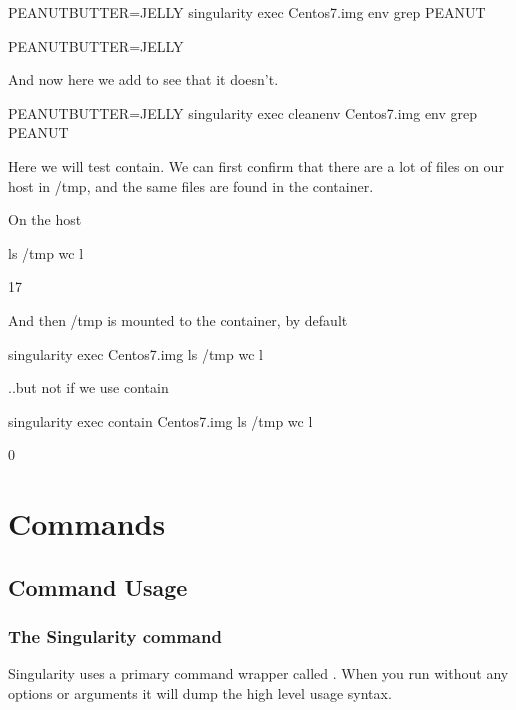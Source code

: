 \documentclass[letterpaper,10pt,english]{sphinxmanual}
\begin{document}
%
\begin{sphinxVerbatim}[commandchars=\\\{\}]
PEANUTBUTTER=JELLY singularity exec Centos7.img env \textbar{} grep PEANUT

PEANUTBUTTER=JELLY
\end{sphinxVerbatim}

And now here we add  to see that it doesn’t.

%
\begin{sphinxVerbatim}[commandchars=\\\{\}]
PEANUTBUTTER=JELLY singularity exec \PYGZhy{}\PYGZhy{}cleanenv Centos7.img env \textbar{} grep PEANUT
\end{sphinxVerbatim}

Here we will test contain. We can first confirm that there are a lot of files on our host in /tmp, and the same files are found in the container.

%
\begin{sphinxVerbatim}[commandchars=\\\{\}]
\PYGZsh{} On the host

\PYGZdl{} ls /tmp \textbar{} wc \PYGZhy{}l

17


\PYGZsh{} And then /tmp is mounted to the container, by default

\PYGZdl{} singularity exec Centos7.img  ls /tmp \textbar{} wc \PYGZhy{}l


\PYGZsh{} ..but not if we use \PYGZhy{}\PYGZhy{}contain

\PYGZdl{} singularity exec \PYGZhy{}\PYGZhy{}contain Centos7.img  ls /tmp \textbar{} wc \PYGZhy{}l

0
\end{sphinxVerbatim}


\section{Commands}
\label{\detokenize{appendix:commands}}

\subsection{Command Usage}
\label{\detokenize{appendix:command-usage}}\label{\detokenize{appendix:id30}}

\subsubsection{The Singularity command}
\label{\detokenize{appendix:the-singularity-command}}\label{\detokenize{appendix:sec-commandlineinterface}}
Singularity uses a primary command wrapper called . When you run 
without any options or arguments it will dump the high level usage
syntax.
\end{document}
